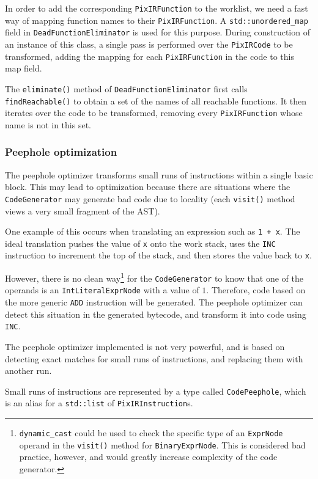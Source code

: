 \documentclass[11pt,a4paper]{scrartcl}
\begin{document}
In order to add the corresponding \verb|PixIRFunction| to the worklist, we need a fast way of mapping function names to their \verb|PixIRFunction|. A \verb|std::unordered_map| field in \verb|DeadFunctionEliminator| is used for this purpose. During construction of an instance of this class, a single pass is performed over the \verb|PixIRCode| to be transformed, adding the mapping for each \verb|PixIRFunction| in the code to this map field.

The \verb|eliminate()| method of \verb|DeadFunctionEliminator| first calls \verb|findReachable()| to obtain a set of the names of all reachable functions. It then iterates over the code to be transformed, removing every \verb|PixIRFunction| whose name is not in this set.

\subsubsection{Peephole optimization}

The peephole optimizer transforms small runs of instructions within a single basic block. This may lead to optimization because there are situations where the \verb|CodeGenerator| may generate bad code due to locality (each \verb|visit()| method views a very small fragment of the AST).

One example of this occurs when translating an expression such as \verb|1 + x|. The ideal translation pushes the value of \verb|x| onto the work stack, uses the \verb|INC| instruction to increment the top of the stack, and then stores the value back to \verb|x|.

However, there is no clean way\footnote{\verb|dynamic_cast| could be used to check the specific type of an \verb|ExprNode| operand in the \verb|visit()| method for \verb|BinaryExprNode|. This is considered bad practice, however, and would greatly increase complexity of the code generator.} for the \verb|CodeGenerator| to know that one of the operands is an \verb|IntLiteralExprNode| with a value of $1$. Therefore, code based on the more generic \verb|ADD| instruction will be generated. The peephole optimizer can detect this situation in the generated bytecode, and transform it into code using \verb|INC|.

The peephole optimizer implemented is not very powerful, and is based on detecting exact matches for small runs of instructions, and replacing them with another run.

Small runs of instructions are represented by a type called \verb|CodePeephole|, which is an alias for a \verb|std::list| of \verb|PixIRInstruction|s.
\end{document}
